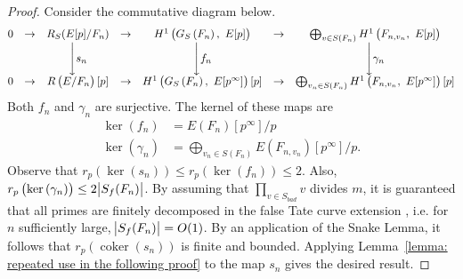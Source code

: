 \documentclass{amsart}
\DeclareMathOperator{\coker}{coker}
\theoremstyle{definition}
\theoremstyle{remark}
\begin{document}
\begin{proof}
Consider the commutative diagram below.
\begin{align*}
\begin{matrix}
0&\rightarrow &R_S(E[p]/F_n)&\rightarrow&H^1\left(G_S\left(F_n\right), \ E[p]\right)&\rightarrow& \bigoplus_{v\in S(F_n)} H^1\left(F_{n,v_n}, \ E[p]\right)
\cr \hbox{ } &&\Bigg\downarrow s_n &&\Bigg\downarrow f_n &&\Bigg\downarrow \gamma_n
\cr 0&\rightarrow &R\left(E/F_n\right)[p]&\rightarrow &H^1\left(G_S\left(F_n\right), \  E[p^\infty]\right)[p]&\rightarrow&  \bigoplus_{v_n \in S(F_n)} H^1\left(F_{n,v_n}, \ E[p^\infty]\right)[p] 
\end{matrix}
\end{align*}
Both $f_n$ and $\gamma_n$ are surjective. 
The kernel of these maps are
\begin{align*}
\ker(f_n) & = E(F_n)[p^\infty]/p\\
\ker(\gamma_n) & = \bigoplus_{v_n\in S(F_n)} E(F_{n,v_n})[p^\infty]/p.
\end{align*}
Observe that $r_p \left( \ker\left(s_n\right)\right) \leq r_p \left( \ker\left(f_n\right)\right) \leq 2$.
Also, $r_p \left( \ker\left(\gamma_n \right)\right)\leq 2 \abs{ S_f(F_n)}$.
By assuming that $\displaystyle\prod_{v\in S_{bad}} v$ divides $m$, it is guaranteed that all primes are finitely decomposed in the false Tate curve extension \cite[Lemma 3.11]{HV03}, i.e. for $n$ sufficiently large, $\abs{S_f(F_n)} =O(1)$.
By an application of the Snake Lemma, it follows that $r_p \left( \coker\left( s_n \right)\right)$ is finite and bounded.
Applying Lemma~\ref{lemma: repeated use in the following proof} to the map $s_n$ gives the desired result.
\end{proof}
\end{document}
